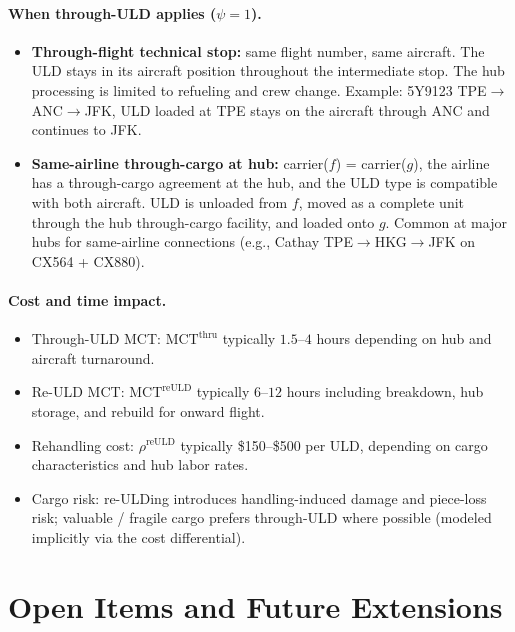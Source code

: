 \documentclass[11pt,a4paper]{article}
\theoremstyle{definition}
\begin{document}
\paragraph{When through-ULD applies ($\psi = 1$).}
\begin{itemize}[noitemsep]
  \item \textbf{Through-flight technical stop:} same flight number, same aircraft. The ULD
        stays in its aircraft position throughout the intermediate stop. The hub processing
        is limited to refueling and crew change. Example: 5Y9123 TPE$\to$ANC$\to$JFK, ULD
        loaded at TPE stays on the aircraft through ANC and continues to JFK.
  \item \textbf{Same-airline through-cargo at hub:} carrier($f$) = carrier($g$), the airline
        has a through-cargo agreement at the hub, and the ULD type is compatible with both
        aircraft. ULD is unloaded from $f$, moved as a complete unit through the hub
        through-cargo facility, and loaded onto $g$. Common at major hubs for same-airline
        connections (e.g., Cathay TPE$\to$HKG$\to$JFK on CX564 + CX880).
\end{itemize}

\paragraph{Cost and time impact.}
\begin{itemize}[noitemsep]
  \item Through-ULD MCT: $\text{MCT}^{\text{thru}}$ typically $1.5$--$4$ hours depending on
        hub and aircraft turnaround.
  \item Re-ULD MCT: $\text{MCT}^{\text{reULD}}$ typically $6$--$12$ hours including
        breakdown, hub storage, and rebuild for onward flight.
  \item Rehandling cost: $\rho^{\text{reULD}}$ typically \$150--\$500 per ULD, depending on
        cargo characteristics and hub labor rates.
  \item Cargo risk: re-ULDing introduces handling-induced damage and piece-loss risk;
        valuable / fragile cargo prefers through-ULD where possible (modeled implicitly via
        the cost differential).
\end{itemize}

\section{Open Items and Future Extensions}
\label{sec:deferred}
\end{document}
